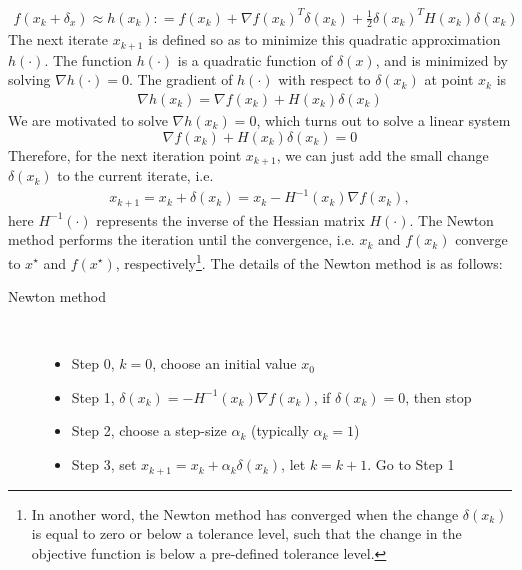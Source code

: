\documentclass  [
  paper    = a4,
  BCOR     = 10mm,
  twoside,
  fontsize = 12pt,
  fleqn,
  toc      = bibnumbered,
  toc      = listofnumbered,
  numbers  = noendperiod,
  headings = normal,
  listof   = leveldown,
  version  = 3.03
]                                       {scrreprt}
\newcommand{\<}{\langle}
\renewcommand{\>}{\rangle}
\begin{document}
\begin{align*}
	f(x_k + \delta_x) \approx h(x_k) : = f(x_k) + \nabla f(x_k)^T\delta(x_k) +\frac{1}{2}\delta(x_k) ^TH(x_k)\delta(x_k) 
\end{align*}
The next iterate $x_{k+1}$ is defined so as to minimize this quadratic approximation $h(\cdot)$. The function $h(\cdot)$ is a quadratic function of $\delta(x)$, and is minimized by solving $\nabla h(\cdot) = 0$. The gradient of $h(\cdot)$ with respect to $\delta(x_k)$ at point $x_k$ is
\begin{align*}
	\nabla h(x_k) = \nabla f(x_k) + H(x_k) \delta(x_k) 
\end{align*}
We are motivated to solve $\nabla h(x_k) =0$, which turns out to solve a linear system
\begin{equation}
	\nabla f(x_k) + H(x_k) \delta(x_k) =0
	\label{HessianEq}
\end{equation}
Therefore, for the next iteration point $x_{k+1}$, we can just add the small change $\delta(x_k)$ to the current iterate, i.e. 
\begin{align*}
	x_{k+1}  = x_k + \delta(x_k) = x_k - H^{-1}(x_k)\nabla f(x_k), 
\end{align*}
here $ H^{-1}(\cdot)$ represents the inverse of the Hessian matrix $H(\cdot)$. The Newton method performs the iteration until the convergence, i.e. $x_k$ and $f(x_k)$ converge to $x^\star$ and $f(x^\star)$, respectively\footnote{In another word, the Newton method has converged when the change $\delta(x_k)$ is equal to zero or below a tolerance level, such that the change in the objective function is below a pre-defined tolerance level.}. The details of the Newton method is as follows: 
\begin{description}
	\item[Newton method]\ 
	\begin{itemize}
		\item Step 0, $k=0$, choose an initial value $x_0$ 
		\item Step 1, $\delta(x_k)  =- H^{-1}(x_k)\nabla f(x_k)$, if $\delta(x_k) =0$, then stop
		\item Step 2, choose a step-size $\alpha_k$ (typically $\alpha_k =1$)
		\item Step 3, set $x_{k+1}  = x_k + \alpha_k \delta(x_k) $, let $k= k+1$. Go to Step 1
	\end{itemize}
\end{description}
\end{document}
